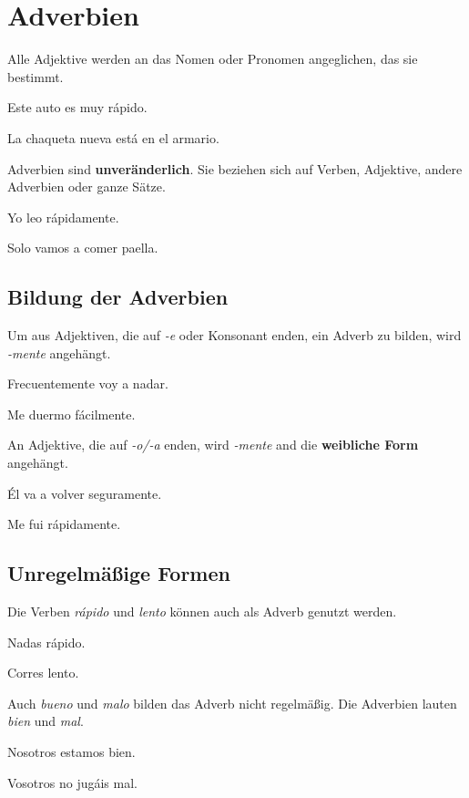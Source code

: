 \section{Adverbien}
Alle Adjektive werden an das Nomen oder Pronomen angeglichen,
das sie bestimmt.
\begin{ejemplos}
    \item Este auto es muy r\'apido.
    \item La chaqueta nueva est\'a en el armario.
\end{ejemplos}
Adverbien sind \textbf{unveränderlich}. Sie beziehen sich
auf Verben, Adjektive, andere Adverbien oder ganze Sätze.
\begin{ejemplos}
    \item Yo leo r\'apidamente.
    \item Solo vamos a comer paella.
\end{ejemplos}
\subsection*{Bildung der Adverbien}
Um aus Adjektiven, die auf \textit{-e} oder Konsonant enden,
ein Adverb zu bilden, wird \textit{-mente} angehängt.
\begin{ejemplos}
    \item Frecuentemente voy a nadar.
    \item Me duermo f\'acilmente.
\end{ejemplos}
An Adjektive, die auf \textit{-o/-a} enden, wird \textit{-mente}
and die \textbf{weibliche Form} angehängt.
\begin{ejemplos}
    \item \'El va a volver seguramente.
    \item Me fui r\'apidamente.
\end{ejemplos}
\subsection*{Unregelmäßige Formen}
Die Verben \textit{r\'apido} und \textit{lento} können auch als Adverb
genutzt werden.
\begin{ejemplos}
    \item Nadas r\'apido.
    \item Corres lento.
\end{ejemplos}
Auch \textit{bueno} und \textit{malo} bilden das Adverb nicht
regelmäßig. Die Adverbien lauten \textit{bien} und \textit{mal}.
\begin{ejemplos}
    \item Nosotros estamos bien.
    \item Vosotros no jug\'ais mal.
\end{ejemplos}

